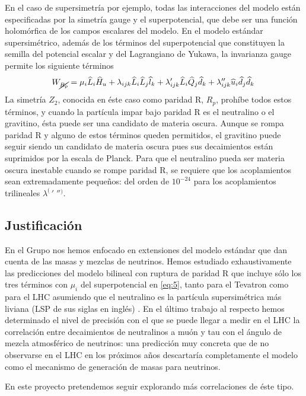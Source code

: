 En el caso de supersimetría por ejemplo, todas las interacciones del
modelo están especificadas por la simetría gauge y el superpotencial,
que debe ser una función holomórfica de los campos escalares del
modelo. En el modelo estándar supersimétrico, además de los términos
del superpotencial que constituyen la semilla del potencial escalar y
del Lagrangiano de Yukawa, la invarianza gauge permite los siguiente
términos
\begin{equation}
  \label{eq:5}
  W_{\cancel{R_p}} = \mu_i\widehat{L}_i\widehat{H}_u + 
  \lambda_{i j k}\widehat{L}_i\widehat{L}_j\widehat{l}_k +
  \lambda'_{i j k}\widehat{L}_i\widehat{Q}_j\widehat{d}_k + 
  \lambda''_{ijk}\widehat{u}_i\widehat{d}_j\widehat{d}_k\,
\end{equation}
La simetría $Z_2$, conocida en éste caso como paridad R, $R_p$,
prohíbe todos estos términos, y cuando la partícula impar bajo paridad
R es el neutralino o el gravitino, ésta puede ser una candidato de
materia oscura. Aunque se rompa paridad R y alguno de estos términos
queden permitidos, el gravitino puede seguir siendo un candidato de
materia oscura pues sus decaimientos están suprimidos por la escala de
Planck. Para que el neutralino pueda ser materia oscura inestable
cuando se rompe paridad R, se requiere que los acoplamientos sean
extremadamente pequeños: del orden de $10^{-24}$ para los
acoplamientos trilineales ${\lambda^{(\ }}'\;''{}^)$.


\subsection{Justificación}

En el Grupo nos hemos enfocado en extensiones del modelo estándar que
dan cuenta de las masas y mezclas de neutrinos. Hemos estudiado
exhaustivamente las predicciones del modelo bilineal con ruptura de
paridad R que incluye sólo los tres términos con $\mu_i$ del
superpotencial en \eqref{eq:5}, tanto para el Tevatron como para el
LHC asumiendo que el neutralino es la partícula supersimétrica más
liviana (LSP de sus siglas en inglés)
\cite{Magro:2003zb,deCampos:2005ri,deCampos:2008ic,deCampos:2008re,DeCampos:2010yu,deCampos:2007bn}. En
el último trabajo al respecto hemos determinado el nivel de precisión
con el que se puede llegar a medir en el LHC la correlación entre
decaimientos de neutralinos a muón y tau con el ángulo de mezcla
atmosférico de neutrinos: una predicción muy concreta que de no observarse en el LHC en los próximos años descartaría completamente el modelo como el mecanismo de generación de masas para neutrinos. 
\begin{proyecto}
  En este proyecto pretendemos seguir explorando más correlaciones de
  éste tipo.
\end{proyecto}

